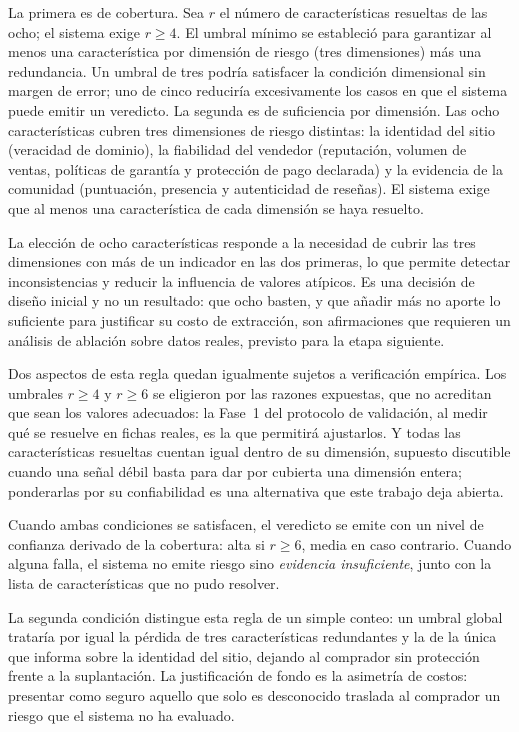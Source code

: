 La primera es de cobertura. Sea $r$ el número de características resueltas de las ocho; el
sistema exige $r \geq 4$. El umbral mínimo se estableció para garantizar al menos una
característica por dimensión de riesgo (tres dimensiones) más una redundancia. Un umbral de
tres podría satisfacer la condición dimensional sin margen de error; uno de cinco reduciría
excesivamente los casos en que el sistema puede emitir un veredicto. La segunda es de
suficiencia por dimensión. Las ocho características cubren tres dimensiones de riesgo distintas:
la identidad del sitio (veracidad de dominio), la fiabilidad del vendedor (reputación, volumen
de ventas, políticas de garantía y protección de pago declarada) y la evidencia de la
comunidad (puntuación, presencia y autenticidad de reseñas). El sistema exige que al menos una
característica de cada dimensión se haya resuelto.

La elección de ocho características responde a la necesidad de cubrir las tres dimensiones con
más de un indicador en las dos primeras, lo que permite detectar inconsistencias y reducir la
influencia de valores atípicos. Es una decisión de diseño inicial y no un resultado: que ocho
basten, y que añadir más no aporte lo suficiente para justificar su costo de extracción, son
afirmaciones que requieren un análisis de ablación sobre datos reales, previsto para la etapa
siguiente.

Dos aspectos de esta regla quedan igualmente sujetos a verificación empírica. Los umbrales
$r \geq 4$ y $r \geq 6$ se eligieron por las razones expuestas, que no acreditan que sean los
valores adecuados: la Fase~1 del protocolo de validación, al medir qué se resuelve en fichas reales, es
la que permitirá ajustarlos. Y todas las características resueltas cuentan igual dentro de su
dimensión, supuesto discutible cuando una señal débil basta para dar por cubierta una
dimensión entera; ponderarlas por su confiabilidad es una alternativa que este trabajo deja
abierta.

Cuando ambas condiciones se satisfacen, el veredicto se emite con un nivel de confianza
derivado de la cobertura: alta si $r \geq 6$, media en caso contrario. Cuando alguna falla, el
sistema no emite riesgo sino \emph{evidencia insuficiente}, junto con la lista de
características que no pudo resolver.

La segunda condición distingue esta regla de un simple conteo: un umbral global trataría por
igual la pérdida de tres características redundantes y la de la única que informa sobre la
identidad del sitio, dejando al comprador sin protección frente a la suplantación. La
justificación de fondo es la asimetría de costos: presentar como seguro aquello que solo es
desconocido traslada al comprador un riesgo que el sistema no ha evaluado.

